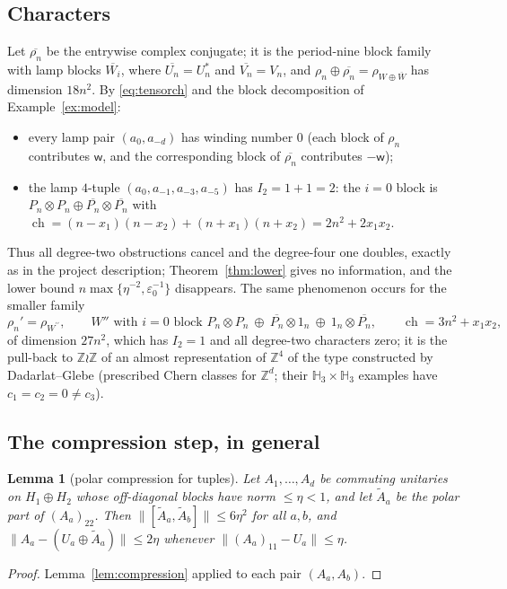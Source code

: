 \documentclass[11pt]{amsart}
\newtheorem{lemma}[theorem]{Lemma}
\theoremstyle{definition}
\theoremstyle{remark}
\newcommand{\Z}{\mathbb Z}
\newcommand{\ch}{\operatorname{ch}}
\newcommand{\wind}{\mathsf w}
\newcommand{\norm}[1]{\lVert #1\rVert}
\newcommand{\lamp}{a}
\begin{document}
\subsection{Characters}
Let $\overline{\rho_n}$ be the entrywise complex conjugate; it is the period-nine block family with lamp blocks $\overline{W_i}$, where $\overline{U_n}=U_n^*$ and $\overline{V_n}=V_n$, and $\rho_n\oplus\overline{\rho_n}=\rho_{W\oplus\overline W}$ has dimension $18n^2$. By \eqref{eq:tensorch} and the block decomposition of Example~\ref{ex:model}:
\begin{itemize}[leftmargin=2em]
\item every lamp pair $(\lamp_0,\lamp_{-d})$ has winding number $0$ (each block of $\rho_n$ contributes $\wind$, and the corresponding block of $\overline{\rho_n}$ contributes $-\wind$);
\item the lamp $4$-tuple $(\lamp_0,\lamp_{-1},\lamp_{-3},\lamp_{-5})$ has $I_2=1+1=2$: the $i=0$ block is $P_n\otimes P_n\oplus\overline{P_n}\otimes\overline{P_n}$ with $\ch=(n-x_1)(n-x_2)+(n+x_1)(n+x_2)=2n^2+2x_1x_2$.
\end{itemize}
Thus all degree-two obstructions cancel and the degree-four one doubles, exactly as in the project description; Theorem~\ref{thm:lower} gives no information, and the lower bound $n\max\{\eta^{-2},\varepsilon_0^{-1}\}$ disappears. The same phenomenon occurs for the smaller family
\begin{equation}\label{eq:minimal}
\rho_n'=\rho_{W^{\prime\prime}},\qquad W''\text{ with }i=0\text{ block } P_n\otimes P_n\ \oplus\ \overline{P_n}\otimes1_n\ \oplus\ 1_n\otimes\overline{P_n},\qquad \ch=3n^2+x_1x_2,
\end{equation}
of dimension $27n^2$, which has $I_2=1$ and all degree-two characters zero; it is the pull-back to $\Z\wr\Z$ of an almost representation of $\Z^4$ of the type constructed by Dadarlat--Glebe \cite{DG25} (prescribed Chern classes for $\Z^d$; their $\mathbb H_3\times\mathbb H_3$ examples have $c_1=c_2=0\ne c_3$).

\subsection{The compression step, in general}

\begin{lemma}[polar compression for tuples]\label{lem:compression-tuple}
Let $A_1,\dots,A_d$ be commuting unitaries on $H_1\oplus H_2$ whose off-diagonal blocks have norm $\le\eta<1$, and let $\tilde A_a$ be the polar part of $(A_a)_{22}$. Then $\norm{[\tilde A_a,\tilde A_b]}\le6\eta^2$ for all $a,b$, and $\norm{A_a-(U_a\oplus\tilde A_a)}\le2\eta$ whenever $\norm{(A_a)_{11}-U_a}\le\eta$.
\end{lemma}
\begin{proof}
Lemma~\ref{lem:compression} applied to each pair $(A_a,A_b)$.
\end{proof}
\end{document}
